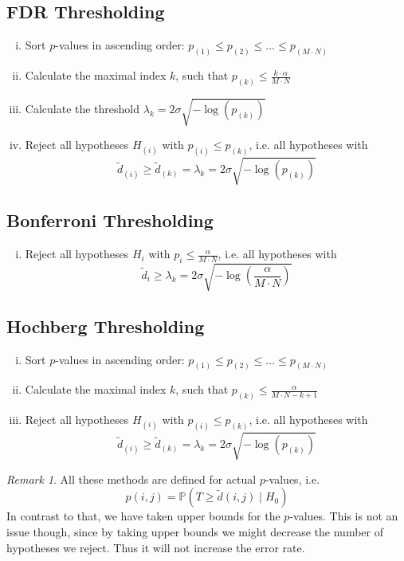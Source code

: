 \documentclass[a4paper,12pt]{article}
\theoremstyle{plain}
\theoremstyle{definition}
\theoremstyle{remark}
\newtheorem{remark}{Remark}
\begin{document}
	\subsection{FDR Thresholding}
	\begin{enumerate}[(i)]
		\item Sort $p$-values in ascending order: $p_{(1)} \leq p_{(2)} \leq \dots \leq p_{(M \cdot N)}$
		\item Calculate the maximal index $k$, such that $p_{(k)} \leq \frac{k \cdot \alpha}{M \cdot N}$
		\item Calculate the threshold $\lambda_{k} = 2 \sigma \sqrt{- \log(p_{(k)})}$
		\item Reject all hypotheses $H_{(i)}$ with $p_{(i)} \leq p_{(k)}$, i.e. all hypotheses with $$\tilde{d}_{(i)} \geq \tilde{d}_{(k)} = \lambda_{k} = 2 \sigma \sqrt{- \log(p_{(k)})}$$
	\end{enumerate}
	
	\subsection{Bonferroni Thresholding}
	\begin{enumerate}[(i)]
		\item Reject all hypotheses $H_{i}$ with $p_{i} \leq \frac{\alpha}{M \cdot N}$, i.e. all hypotheses with $$\tilde{d}_{i} \geq \lambda_k = 2 \sigma \sqrt{- \log \left( \frac{\alpha}{M \cdot N} \right)}$$
	\end{enumerate}
	
	\subsection{Hochberg Thresholding}
	\begin{enumerate}[(i)]
		\item Sort $p$-values in ascending order: $p_{(1)} \leq p_{(2)} \leq \dots \leq p_{(M \cdot N)}$
		\item Calculate the maximal index $k$, such that $p_{(k)} \leq \frac{\alpha}{M \cdot N - k + 1}$
		\item Reject all hypotheses $H_{(i)}$ with $p_{(i)} \leq p_{(k)}$, i.e. all hypotheses with $$\tilde{d}_{(i)} \geq \tilde{d}_{(k)} = \lambda_{k} = 2 \sigma \sqrt{- \log(p_{(k)})}$$
	\end{enumerate}
	
	\begin{remark}
		All these methods are defined for actual $p$-values, i.e.
		\begin{equation*}
			p(i, j) = \mathbb{P}(T \geq \tilde{d}(i, j) \mid H_0)
		\end{equation*}
		In contrast to that, we have taken upper bounds for the $p$-values. This is not an issue though, since by taking upper bounds we might decrease the number of hypotheses we reject. Thus it will not increase the error rate.
	\end{remark}
	
\end{document}
